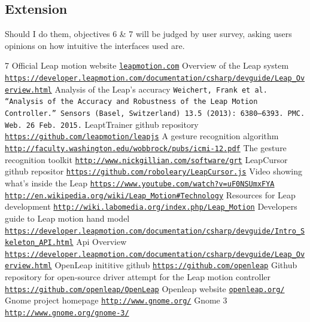 \documentclass[a4paper]{article}
\begin{document}
\subsection{Extension}
Should I do them, objectives 6 \& 7 will be judged by user survey, asking users opinions on how intuitive the interfaces used are.
\begin{thebibliography} {7}
Official Leap motion website \texttt{\url{leapmotion.com}}
Overview of the Leap system \texttt{\url{https://developer.leapmotion.com/documentation/csharp/devguide/Leap_Overview.html}}
Analysis of the Leap's accuracy
\texttt{Weichert, Frank et al. “Analysis of the Accuracy and Robustness of the Leap Motion Controller.” Sensors (Basel, Switzerland) 13.5 (2013): 6380–6393. PMC. Web. 26 Feb. 2015.}
LeaptTrainer github repository
\texttt{\url{https://github.com/leapmotion/leapjs}}
A gesture recognition algorithm
\texttt{\url{http://faculty.washington.edu/wobbrock/pubs/icmi-12.pdf}}
The gesture recognition toolkit
\texttt{\url{http://www.nickgillian.com/software/grt}}
LeapCursor github repositor
\texttt{\url{https://github.com/roboleary/LeapCursor.js}}
Video showing what's inside the Leap \texttt{\url{https://www.youtube.com/watch?v=uF0NSUmxFYA}}
\texttt{\url{http://en.wikipedia.org/wiki/Leap_Motion\#Technology}}
Resources for Leap development
\texttt{\url{http://wiki.labomedia.org/index.php/Leap_Motion}}
Developers guide to Leap motion hand model
\texttt{\url{https://developer.leapmotion.com/documentation/csharp/devguide/Intro_Skeleton_API.html}}
Api Overview 
\texttt{\url{https://developer.leapmotion.com/documentation/csharp/devguide/Leap_Overview.html}}
OpenLeap inititive github
\texttt{\url{https://github.com/openleap}}
Github repository for open-source driver attempt for the Leap motion controller
\texttt{\url{https://github.com/openleap/OpenLeap}}
Openleap  website
\texttt{\url{openleap.org/}}
Gnome project homepage
\texttt{\url{http://www.gnome.org/}}
Gnome 3
\texttt{\url{http://www.gnome.org/gnome-3/}}
\end{thebibliography}
\end{document}
